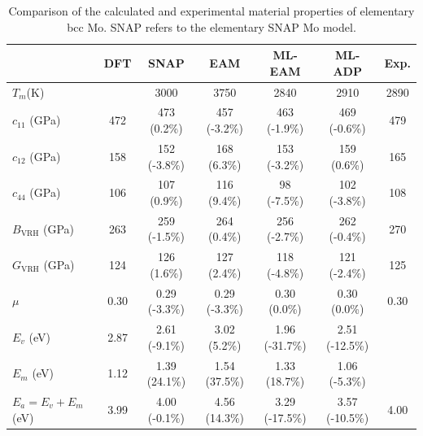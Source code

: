 \documentclass[final,3p,times]{elsarticle}
\begin{document}
% 
%
\begin{table}
\centering
\begin{tabular}{lcccccc}
\hline
                              & DFT  & SNAP \cite{SNAP_Mo} & EAM \cite{ZJW2} & ML-EAM         & ML-ADP         & Exp.                      \\
\hline
$T_{m}$(K)                    &      & 3000                & 3750            & 2840           & 2910           & 2890                      \\
$c_{11}$ (GPa)                & 472  & 473 (0.2\%)         & 457 (-3.2\%)    & 463 (-1.9\%)   & 469 (-0.6\%)   & 479 \cite{Mo_Elastic_Exp} \\
$c_{12}$ (GPa)                & 158  & 152 (-3.8\%)        & 168 (6.3\%)     & 153 (-3.2\%)   & 159 (0.6\%)    & 165 \cite{Mo_Elastic_Exp} \\
$c_{44}$ (GPa)                & 106  & 107 (0.9\%)         & 116 (9.4\%)     & 98 (-7.5\%)    & 102 (-3.8\%)   & 108 \cite{Mo_Elastic_Exp} \\
$B_{\mathrm{VRH}}$ (GPa)      & 263  & 259 (-1.5\%)        & 264 (0.4\%)     & 256 (-2.7\%)   & 262 (-0.4\%)   & 270 \cite{Mo_Elastic_Exp} \\
$G_{\mathrm{VRH}}$ (GPa)      & 124  & 126 (1.6\%)         & 127 (2.4\%)     & 118 (-4.8\%)   & 121 (-2.4\%)   & 125 \cite{Mo_Elastic_Exp} \\
$\mu$                         & 0.30 & 0.29 (-3.3\%)       & 0.29 (-3.3\%)   & 0.30 (0.0\%)   & 0.30 (0.0\%)   & 0.30                      \\
$E_{v}$ (eV)                  & 2.87 & 2.61 (-9.1\%)       & 3.02 (5.2\%)    & 1.96 (-31.7\%) & 2.51 (-12.5\%) &                           \\
$E_{m}$ (eV)                  & 1.12 & 1.39 (24.1\%)       & 1.54 (37.5\%)   & 1.33 (18.7\%)  & 1.06 (-5.3\%)  &                           \\
$E_{a} = E_{v} + E_{m} $ (eV) & 3.99 & 4.00 (-0.1\%)       & 4.56 (14.3\%)   & 3.29 (-17.5\%) & 3.57 (-10.5\%) & 4.00 \cite{Mo_Ea_Exp}     \\
\hline
\end{tabular}
\caption{\label{table:Mo_properties} Comparison of the calculated and 
experimental material properties of elementary bcc Mo. SNAP refers to the 
elementary SNAP Mo model.
}
\end{table}
\end{document}
